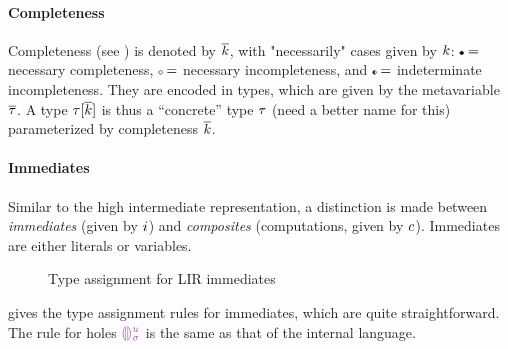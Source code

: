 \documentclass[index.tex]{subfiles}
\begin{document}
\paragraph{Completeness}
Completeness (see ) is denoted by $\overline{k}$, with "necessarily" cases given
by $k$: $\CNC =$ necessary completeness, $\CNI =$ necessary incompleteness, and
$\CII =$ indeterminate incompleteness. They are encoded in types, which are given by the
metavariable $\overline{\tau}$. A type $\tau[\overline{k}]$ is thus a ``concrete''
type $\tau$ (need a better name for this) parameterized by completeness
$\overline{k}$.

\paragraph{Immediates}
Similar to the high intermediate representation, a distinction is made between \emph{immediates}
(given by $i$) and \emph{composites} (computations, given by $c$). Immediates
are either literals or variables.

\begin{figure}
  \judgbox{\hasTypeCtx{\CtxVar}{\HoleCtxVar}{\SortImmVar}{\SortTypVar}}
  \caption{Type assignment for LIR immediates}
  \label{fig:lir-ta-imm}
\end{figure}

 gives the type assignment rules for immediates, which are quite
straightforward. The rule for holes $\EEHole{\SortHoleIdVar}{\SortHoleEnvVar}$ is the same as
that of the internal \Hazel{} language.
\end{document}
